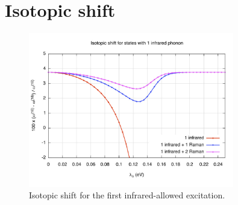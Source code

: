 \section{Isotopic shift}
\label{sec:polaron-isotopic-shift}

\begin{figure}[ht!]
\centering
\includegraphics[width=0.8\textwidth]{images/isot-1ir.jpg}
\caption{Isotopic shift for the first infrared-allowed excitation.}
\label{fig:isot-1ir}
\end{figure}


